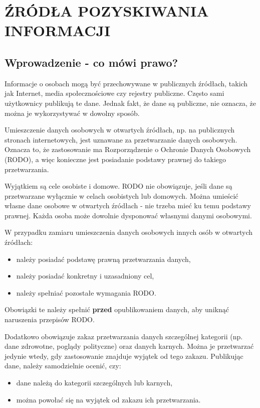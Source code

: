 \chapter{ŹRÓDŁA POZYSKIWANIA INFORMACJI}
\enlargethispage{20pt}

\section{Wprowadzenie - co mówi prawo?}

Informacje o osobach mogą być przechowywane w publicznych źródłach, takich jak Internet, media społecznościowe czy rejestry publiczne. Często sami użytkownicy publikują te dane. Jednak fakt, że dane są publiczne, nie oznacza, że można je wykorzystywać w dowolny sposób.

Umieszczenie danych osobowych w otwartych źródłach, np. na publicznych stronach internetowych, jest uznawane za przetwarzanie danych osobowych. Oznacza to, że zastosowanie ma Rozporządzenie o Ochronie Danych Osobowych (RODO), a więc konieczne jest posiadanie podstawy prawnej do takiego przetwarzania.

Wyjątkiem są cele osobiste i domowe. RODO nie obowiązuje, jeśli dane są przetwarzane wyłącznie w celach osobistych lub domowych. Można umieścić własne dane osobowe w otwartych źródłach - nie trzeba mieć ku temu podstawy prawnej. Każda osoba może dowolnie dysponować własnymi danymi osobowymi.

W przypadku zamiaru umieszczenia danych osobowych innych osób w otwartych źródłach:
\begin{itemize}
    \item należy posiadać podstawę prawną przetwarzania danych,
    \item należy posiadać konkretny i uzasadniony cel,
    \item należy spełniać pozostałe wymagania RODO.
\end{itemize}

Obowiązki te należy spełnić \textbf{przed} opublikowaniem danych, aby uniknąć naruszenia przepisów RODO.

Dodatkowo obowiązuje zakaz przetwarzania danych szczególnej kategorii (np. dane zdrowotne, poglądy polityczne) oraz danych karnych. Można je przetwarzać jedynie wtedy, gdy zastosowanie znajduje wyjątek od tego zakazu. Publikując dane, należy samodzielnie ocenić, czy:
\begin{itemize}
    \item dane należą do kategorii szczególnych lub karnych,
    \item można powołać się na wyjątek od zakazu ich przetwarzania.
\end{itemize}

